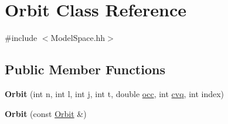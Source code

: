 \hypertarget{classOrbit}{}\section{Orbit Class Reference}
\label{classOrbit}


{\ttfamily \#include $<$Model\+Space.\+hh$>$}

\subsection*{Public Member Functions}
\begin{DoxyCompactItemize}
\item 
\mbox{\label{classOrbit_a9df0d8fc6d6dd366b7fd11be3d6a40e0}} 
{\bfseries Orbit} (int n, int l, int j, int t, double \hyperlink{classOrbit_a68ea77afa00c23030e1c4260ff64dcbc}{occ}, int \hyperlink{classOrbit_a75cb422d6cd5fcc04ca5e2dc2c1e1d4e}{cvq}, int index)
\item 
\mbox{\label{classOrbit_acc12b8fdfccd5dc2aacbf06baa7a9d03}} 
{\bfseries Orbit} (const \hyperlink{classOrbit}{Orbit} \&)
\end{DoxyCompactItemize}
